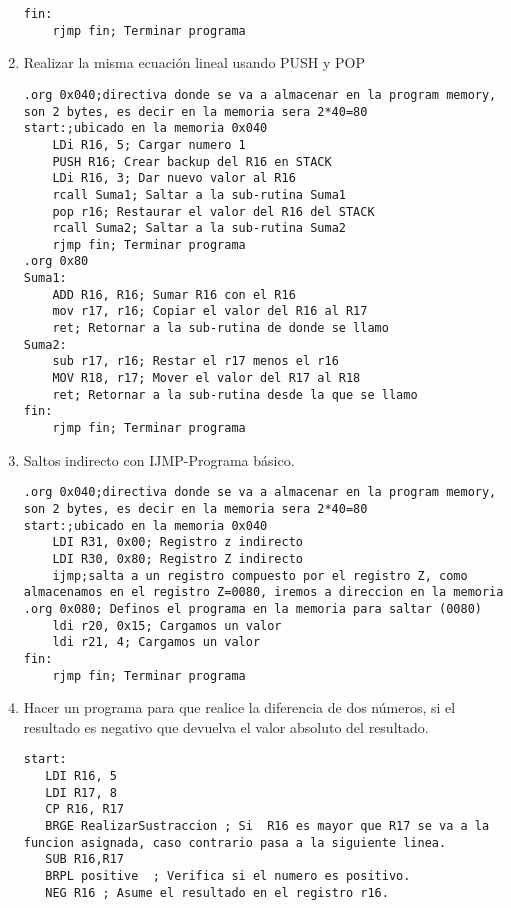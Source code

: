 \documentclass[
	12pt, %
	fleqn, %
	a4paper, %
	oneside, %
]{LegrandOrangeBook}
\begin{document}
\begin{enumerate}
\begin{lstlisting}[language={[RISC-V]Assembler},frame=single,caption={Solución a una ecuación lineal},captionpos=b,numbers=none]
fin:
	rjmp fin; Terminar programa
\end{lstlisting}
\item Realizar la misma ecuación lineal usando PUSH y POP
\begin{lstlisting}[language={[RISC-V]Assembler},frame=single,caption={Ecuación lineal usando PUSH y POP},captionpos=b,numbers=none]
.org 0x040;directiva donde se va a almacenar en la program memory, son 2 bytes, es decir en la memoria sera 2*40=80
start:;ubicado en la memoria 0x040
	LDi R16, 5; Cargar numero 1
	PUSH R16; Crear backup del R16 en STACK
	LDi R16, 3; Dar nuevo valor al R16
	rcall Suma1; Saltar a la sub-rutina Suma1
	pop r16; Restaurar el valor del R16 del STACK
	rcall Suma2; Saltar a la sub-rutina Suma2
	rjmp fin; Terminar programa
.org 0x80
Suma1:
	ADD R16, R16; Sumar R16 con el R16
	mov r17, r16; Copiar el valor del R16 al R17
	ret; Retornar a la sub-rutina de donde se llamo
Suma2:
	sub r17, r16; Restar el r17 menos el r16
	MOV R18, r17; Mover el valor del R17 al R18
	ret; Retornar a la sub-rutina desde la que se llamo
fin:
	rjmp fin; Terminar programa
\end{lstlisting}
\item Saltos indirecto con IJMP-Programa básico.
\begin{lstlisting}[language={[RISC-V]Assembler},frame=single,caption={Programa básico-IJMP},captionpos=b,numbers=none]
.org 0x040;directiva donde se va a almacenar en la program memory, son 2 bytes, es decir en la memoria sera 2*40=80
start:;ubicado en la memoria 0x040
	LDI R31, 0x00; Registro z indirecto
	LDI R30, 0x80; Registro Z indirecto
	ijmp;salta a un registro compuesto por el registro Z, como almacenamos en el registro Z=0080, iremos a direccion en la memoria
.org 0x080; Definos el programa en la memoria para saltar (0080)
	ldi r20, 0x15; Cargamos un valor
	ldi r21, 4; Cargamos un valor
fin:
	rjmp fin; Terminar programa
\end{lstlisting}
\item Hacer un programa para que realice la diferencia de dos números, si el resultado es negativo que devuelva el valor absoluto del resultado.
\begin{lstlisting}[language={[RISC-V]Assembler},frame=single,caption={Desarrollo entre 2 o más sub-rutinas},captionpos=b,numbers=none]
start:
   LDI R16, 5
   LDI R17, 8
   CP R16, R17
   BRGE RealizarSustraccion ; Si  R16 es mayor que R17 se va a la funcion asignada, caso contrario pasa a la siguiente linea.
   SUB R16,R17
   BRPL positive  ; Verifica si el numero es positivo.
   NEG R16 ; Asume el resultado en el registro r16.

\end{lstlisting}
\end{enumerate}
\end{document}
